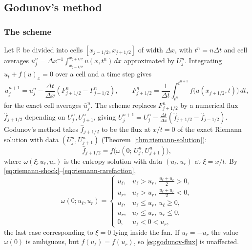 
\subsection{Godunov's method}
\label{subsec:godunov}

\subsubsection{The scheme}
\label{subsubsec:godunov-flux}

Let $\mathbb{R}$ be divided into cells $[x_{j-1/2},x_{j+1/2}]$ of width
$\Delta x$, with $t^n=n\Delta t$ and cell averages
$\bar u_j^n=\Delta x^{-1}\int_{x_{j-1/2}}^{x_{j+1/2}}u(x,t^n)\,dx$ approximated by $U_j^n$.
Integrating $u_t+f(u)_x=0$ over a cell and a time step gives
\begin{equation}
  \bar u_j^{n+1} = \bar u_j^n - \frac{\Delta t}{\Delta x}
  \left( F_{j+1/2}^n - F_{j-1/2}^n \right),
  \qquad F_{j+1/2}^n=\frac1{\Delta t}\int_{t^n}^{t^{n+1}}f\big(u(x_{j+1/2},t)\big)\,dt,
\end{equation}
for the exact cell averages $\bar u_j^n$. The scheme replaces $F_{j+1/2}^n$ by a
numerical flux $\widehat f_{j+1/2}$ depending on $U_j^n,U_{j+1}^n$, giving
$U_j^{n+1}=U_j^n-\frac{\Delta t}{\Delta x}(\widehat f_{j+1/2}-\widehat f_{j-1/2})$.
Godunov's method \cite{godunov1959} takes $\widehat f_{j+1/2}$ to be the flux
at $x/t=0$ of the exact Riemann solution with data $(U_j^n,U_{j+1}^n)$
(Theorem~\ref{thm:riemann-solution}):
\begin{equation}
  \label{eq:godunov-flux}
  \widehat f_{j+1/2} = f\big(\omega(0;\, U_j^n, U_{j+1}^n)\big),
\end{equation}
where $\omega(\xi;u_\ell,u_r)$ is the entropy solution with data $(u_\ell,u_r)$ at
$\xi=x/t$. By \eqref{eq:riemann-shock}--\eqref{eq:riemann-rarefaction},
\begin{equation}
  \omega(0; u_\ell,u_r) =
  \begin{cases}
    u_\ell, & u_\ell>u_r,\ \tfrac{u_\ell+u_r}{2}>0, \\
    u_r, & u_\ell>u_r,\ \tfrac{u_\ell+u_r}{2}<0, \\
    u_\ell, & u_\ell\le u_r,\ u_\ell\ge0, \\
    u_r, & u_\ell\le u_r,\ u_r\le0, \\
    0, & u_\ell < 0 < u_r,
  \end{cases}
\end{equation}
the last case corresponding to $\xi=0$ lying inside the fan. If
$u_\ell=-u_r$ the value $\omega(0)$ is ambiguous, but $f(u_\ell)=f(u_r)$, so
\eqref{eq:godunov-flux} is unaffected.

